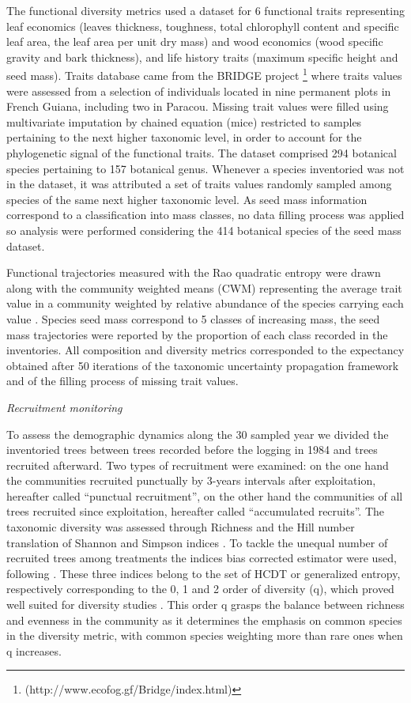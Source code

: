 \documentclass[fleqn,10pt]{ArtEcoFoG} %
\begin{document}
The functional diversity metrics used a dataset for 6 functional traits
representing leaf economics (leaves thickness, toughness, total
chlorophyll content and specific leaf area, the leaf area per unit dry
mass) and wood economics (wood specific gravity and bark thickness), and
life history traits (maximum specific height and seed mass). Traits
database came from the BRIDGE project \footnote{(http://www.ecofog.gf/Bridge/index.html)}
where traits values were assessed from a selection of individuals
located in nine permanent plots in French Guiana, including two in
Paracou. Missing trait values were filled using multivariate imputation
by chained equation (mice) restricted to samples pertaining to the next
higher taxonomic level, in order to account for the phylogenetic signal
of the functional traits. The dataset comprised 294 botanical species
pertaining to 157 botanical genus. Whenever a species inventoried was
not in the dataset, it was attributed a set of traits values randomly
sampled among species of the same next higher taxonomic level. As seed
mass information correspond to a classification into mass classes, no
data filling process was applied so analysis were performed considering
the 414 botanical species of the seed mass dataset.

Functional trajectories measured with the Rao quadratic entropy were
drawn along with the community weighted means (CWM) representing the
average trait value in a community weighted by relative abundance of the
species carrying each value \citep{Diaz2007, Garnier2004}. Species seed
mass correspond to 5 classes of increasing mass, the seed mass
trajectories were reported by the proportion of each class recorded in
the inventories. All composition and diversity metrics corresponded to
the expectancy obtained after 50 iterations of the taxonomic uncertainty
propagation framework and of the filling process of missing trait
values.

\emph{Recruitment monitoring}

To assess the demographic dynamics along the 30 sampled year we divided
the inventoried trees between trees recorded before the logging in 1984
and trees recruited afterward. Two types of recruitment were examined:
on the one hand the communities recruited punctually by 3-years
intervals after exploitation, hereafter called ``punctual recruitment'',
on the other hand the communities of all trees recruited since
exploitation, hereafter called ``accumulated recruits''. The taxonomic
diversity was assessed through Richness and the Hill number translation
of Shannon and Simpson indices \citep{Hill1973}. To tackle the unequal
number of recruited trees among treatments the indices bias corrected
estimator were used, following \citep{chao2015estimating, Marcon2015b}.
These three indices belong to the set of HCDT or generalized entropy,
respectively corresponding to the 0, 1 and 2 order of diversity (q),
which proved well suited for diversity studies
\citep{Patil1982, Tothmeresz1995}. This order q grasps the balance
between richness and evenness in the community as it determines the
emphasis on common species in the diversity metric, with common species
weighting more than rare ones when q increases.
\end{document}
